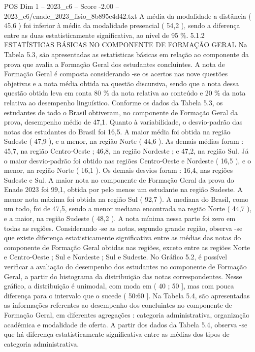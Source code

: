 \begin{textsample}{POS Dim 1 – 2023\_c6 – Score -2.00 – 2023\_c6/enade\_2023\_fisio\_8b895e4d42.txt}
A média da modalidade a distância ( 45,6 ) foi inferior à média da modalidade presencial ( 54,2 ), sendo a diferença entre as duas estatisticamente significativa, ao nível de 95 \%. 5.1.2 ESTATÍSTICAS BÁSICAS NO COMPONENTE DE FORMAÇÃO GERAL Na Tabela 5.3, são apresentadas as estatísticas básicas em relação ao componente da prova que avalia a Formação Geral dos estudantes concluintes.
A nota de Formação Geral é composta considerando -se os acertos nas nove questões objetivas e a nota média obtida na questão discursiva, sendo que a nota dessa questão obtida leva em conta 80 \% da nota relativa ao conteúdo e 20 \% da nota relativa ao desempenho linguístico.
Conforme os dados da Tabela 5.3, os estudantes de todo o Brasil obtiveram, no componente de Formação Geral da prova, desempenho médio de 47,1.
Quanto à variabilidade, o desvio-padrão das notas dos estudantes do Brasil foi 16,5.
A maior média foi obtida na região Sudeste ( 47,9 ), e a menor, na região Norte ( 44,6 ).
As demais médias foram : 45,7, na região Centro-Oeste ; 46,8, na região Nordeste ; e 47,2, na região Sul.
Já o maior desvio-padrão foi obtido nas regiões Centro-Oeste e Nordeste ( 16,5 ), e o menor, na região Norte ( 16,1 ).
Os demais desvios foram : 16,4, nas regiões Sudeste e Sul.
A maior nota no componente de Formação Geral da prova do Enade 2023 foi 99,1, obtida por pelo menos um estudante na região Sudeste.
A menor nota máxima foi obtida na região Sul ( 92,7 ).
A mediana do Brasil, como um todo, foi de 47,5, sendo a menor mediana encontrada na região Norte ( 44,7 ), e a maior, na região Sudeste ( 48,2 ).
A nota mínima nessa parte foi zero em todas as regiões.
Considerando -se as notas, segundo grande região, observa -se que existe diferença estatisticamente significativa entre as médias das notas do componente de Formação Geral obtidas nas regiões, exceto entre as regiões Norte e Centro-Oeste ; Sul e Nordeste ; Sul e Sudeste.
No Gráfico 5.2, é possível verificar a avaliação do desempenho dos estudantes no componente de Formação Geral, a partir do histograma da distribuição das notas correspondentes.
Nesse gráfico, a distribuição é unimodal, com moda em ( 40 ; 50 ], mas com pouca diferença para o intervalo que o sucede ( 50:60 ].
Na Tabela 5.4, são apresentadas as informações referentes ao desempenho dos concluintes no componente de Formação Geral, em diferentes agregações : categoria administrativa, organização acadêmica e modalidade de oferta.
A partir dos dados da Tabela 5.4, observa -se que há diferença estatisticamente significativa entre as médias dos tipos de categoria administrativa.

\end{textsample}
